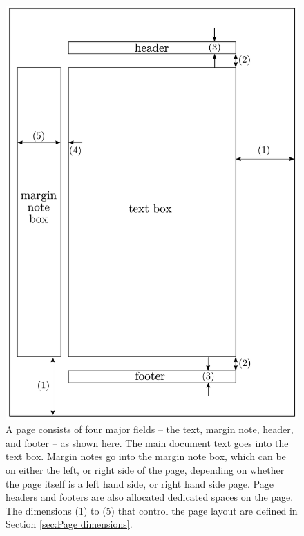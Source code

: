 \documentclass[twoside,openany]{thesis}
\begin{document}
\begin{figure}
    \begin{center}
        \includegraphics[scale=0.35]{pgdim.pdf}
    \end{center}
    \caption[Document page layout dimensions]{
        A page consists of four major fields -- the text, margin note, header, and footer -- as shown here.
        The main document text goes into the text box.
        Margin notes go into the margin note box, which can be on either the left, or right side of the page, depending on whether the page itself is a left hand side, or right hand side page.
        Page headers and footers are also allocated dedicated spaces on the page.
        The dimensions (1) to (5) that control the page layout are defined in Section \ref{sec:Page dimensions}.
    }
    \label{fig:Document page layout dimensions}
\end{figure}
\end{document}
